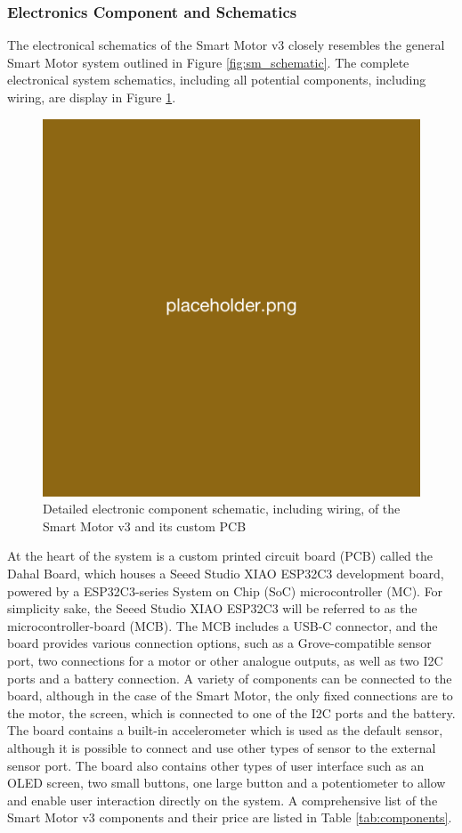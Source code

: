 \subsubsection{\label{sec:methods_sm_elec}Electronics Component and Schematics}
The electronical schematics of the Smart Motor v3 closely resembles the general Smart Motor system outlined in Figure \ref{fig:sm_schematic}. The complete electronical system schematics, including all potential components, including wiring, are display in Figure \ref{fig:sm_elec_schematic}.

\begin{figure}[H]
    \centering
    \includegraphics[width=0.75\linewidth]{overleaf/images/placeholder.png}
    \vspace{\ftspace}
    \caption{Detailed electronic component schematic, including wiring, of the Smart Motor v3 and its custom PCB}
    \label{fig:sm_elec_schematic}
\end{figure}

At the heart of the system is a custom printed circuit board (PCB) called the Dahal Board, which houses a Seeed Studio XIAO ESP32C3 development board, powered by a ESP32C3-series System on Chip (SoC) microcontroller (MC). For simplicity sake, the Seeed Studio XIAO ESP32C3 will be referred to as the microcontroller-board (MCB). The MCB includes a USB-C connector, and the board provides various connection options, such as a Grove-compatible sensor port, two connections for a motor or other analogue outputs, as well as two I2C ports and a battery connection. A variety of components can be connected to the board, although in the case of the Smart Motor, the only fixed connections are to the motor, the screen, which is connected to one of the I2C ports and the battery. The board contains a built-in accelerometer which is used as the default sensor, although it is possible to connect and use other types of sensor to the external sensor port. The board also contains other types of user interface such as an OLED screen, two small buttons, one large button and a potentiometer to allow and enable user interaction directly on the system. A comprehensive list of the Smart Motor v3 components and their price are listed in Table \ref{tab:components}.

